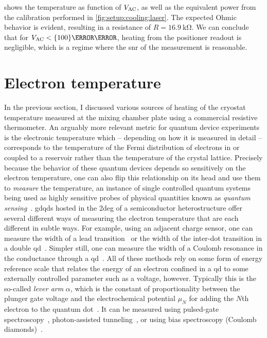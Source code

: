  shows the temperature as function of $V_{\mathrm{AC}}$, as well as the equivalent power from the calibration performed in \cref{fig:setup:cooling:laser}.
The expected Ohmic behavior is evident, resulting in a resistance of $R=\qty{16.9}{\kilo\ohm}$.
We can conclude that for $V_{\mr{AC}} < \qty{100}{\milli\volt}$, heating from the positioner readout is negligible, which is a regime where the \gls{snr} of the measurement is reasonable.

\section{Electron temperature}\label{sec:setup:cooling:etemp}
In the previous section, I discussed various sources of heating of the cryostat temperature measured at the mixing chamber plate using a commercial resistive thermometer.
An arguably more relevant metric for quantum device experiments is the electronic temperature which -- depending on how it is measured in detail -- corresponds to the temperature of the Fermi distribution of electrons in or coupled to a reservoir rather than the temperature of the crystal lattice.
Precisely because the behavior of these quantum devices depends so sensitively on the electron temperature, one can also flip this relationship on its head and use them to \emph{measure} the temperature, an instance of single controlled quantum systems being used as highly sensitive probes of physical quantities known as \emph{quantum sensing}~\cite{Degen2017}.
\Glspl{gdqd} hosted in the \gls{2deg} of a semiconductor heterostructure offer several different ways of measuring the electron temperature that are each different in subtle ways.
For example, using an adjacent charge sensor, one can measure the width of a lead
transition~\cite{Maradan2014} or the width of the inter-dot transition in a double \gls{qd}~\cite{DiCarlo2004}.
Simpler still, one can measure the width of a Coulomb resonance in the conductance through a \gls{qd}~\cite{Ihn2009,Maradan2014}.
All of these methods rely on some form of energy reference scale that relates the energy of an electron confined in a \gls{qd} to some externally controlled parameter such as a voltage, however.
Typically this is the so-called \emph{lever arm} $\alpha$, which is the constant of proportionality between the plunger gate voltage and the electrochemical potential $\mu_N$ for adding the $N$th electron to the quantum dot~\cite{Ihn2009}.
It can be measured using pulsed-gate spectroscopy~\cite{Fujisawa2001,Harbusch2010}, photon-assisted tunneling~\cite{Kouwenhoven1994}, or using bias spectroscopy (Coulomb diamonds)~\cite{Kouwenhoven2001,Ihn2009}.

